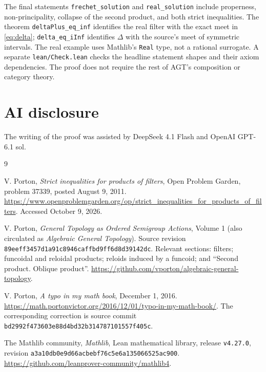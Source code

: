 \documentclass[11pt,a4paper]{amsart}
\theoremstyle{definition}
\theoremstyle{remark}
\begin{document}
The final statements \texttt{frechet\_solution} and
\texttt{real\_solution} include properness, non-principality, collapse of the
second product, and both strict inequalities. The theorem
\texttt{deltaPlus\_eq\_inf} identifies the real filter with the exact meet in
\eqref{eq:delta}; \texttt{delta\_eq\_iInf} identifies $\Delta$ with the
source's meet of symmetric intervals. The real example uses Mathlib's
\texttt{Real} type, not a rational surrogate. A separate
\texttt{lean/Check.lean} checks the headline statement shapes and their axiom
dependencies. The proof does not require the rest of AGT's composition or
category theory.

\section*{AI disclosure}
The writing of the proof was assisted by DeepSeek 4.1 Flash and OpenAI
GPT-6.1 sol.

\begin{thebibliography}{9}
\raggedright

V. Porton, \emph{Strict inequalities for products of filters},
Open Problem Garden, problem 37339, posted August 9, 2011.
\url{https://www.openproblemgarden.org/op/strict_inequalities_for_products_of_filters}.
Accessed October 9, 2026.

V. Porton, \emph{General Topology as Ordered Semigroup Actions}, Volume 1
(also circulated as \emph{Algebraic General Topology}). Source revision
\texttt{89eeff3457d1a91c8946caffbd9ff6d8d39142dc}.
Relevant sections: filters; funcoidal and reloidal products; reloids induced by
a funcoid; and ``Second product. Oblique product''.
\url{https://github.com/vporton/algebraic-general-topology}.

V. Porton, \emph{A typo in my math book}, December 1, 2016.
\url{https://math.portonvictor.org/2016/12/01/typo-in-my-math-book/}.
The corresponding correction is source commit
\texttt{bd2992f473603e88d4bd32b314787101557f405c}.

The Mathlib community, \emph{Mathlib}, Lean mathematical library, release
\texttt{v4.27.0}, revision
\texttt{a3a10db0e9d66acbebf76c5e6a135066525ac900}.
\url{https://github.com/leanprover-community/mathlib4}.

\end{thebibliography}
\end{document}
